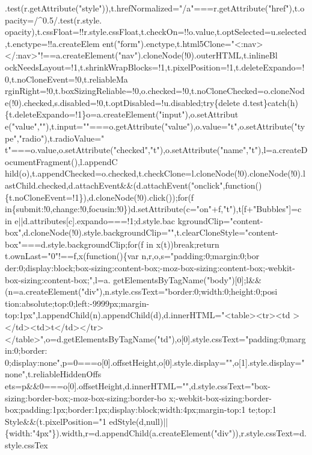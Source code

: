 \begin{DoxyCode}
{      .test(r.getAttribute("style")),t.hrefNormalized="/a"===r.getAttribute("href"),t.opacity=/^0.5/.test(r.style.
      opacity),t.cssFloat=!!r.style.cssFloat,t.checkOn=!!o.value,t.optSelected=u.selected,t.enctype=!!a.createElem
      ent("form").enctype,t.html5Clone="<:nav></:nav>"!==a.createElement("nav").cloneNode(!0).outerHTML,t.inlineBl
      ockNeedsLayout=!1,t.shrinkWrapBlocks=!1,t.pixelPosition=!1,t.deleteExpando=!0,t.noCloneEvent=!0,t.reliableMa
      rginRight=!0,t.boxSizingReliable=!0,o.checked=!0,t.noCloneChecked=o.cloneNode(!0).checked,s.disabled=!0,t.optDisabled=!u.disabled;try\{delete
       d.test\}catch(h)\{t.deleteExpando=!1\}o=a.createElement("input"),o.setAttribut
      e("value",""),t.input=""===o.getAttribute("value"),o.value="t",o.setAttribute("type","radio"),t.radioValue="
      t"===o.value,o.setAttribute("checked","t"),o.setAttribute("name","t"),l=a.createDocumentFragment(),l.appendC
      hild(o),t.appendChecked=o.checked,t.checkClone=l.cloneNode(!0).cloneNode(!0).lastChild.checked,d.attachEvent&&(d.attachEvent("onclick",function()\{t.noCloneEvent=!1\}),d.cloneNode(!0).click());for(f
       in\{submit:!0,change:!0,focusin:!0\})d.setAttribute(c="on"+f,"t"),t[f+"Bubbles"]=c in
       e||d.attributes[c].expando===!1;d.style.bac
      kgroundClip="content-box",d.cloneNode(!0).style.backgroundClip="",t.clearCloneStyle="content-box"===d.style.backgroundClip;for(f in x(t))break;return t.ownLast="0"!==f,x(function()\{var
       n,r,o,s="padding:0;margin:0;bor
      der:0;display:block;box-sizing:content-box;-moz-box-sizing:content-box;-webkit-box-sizing:content-box;",l=a.
      getElementsByTagName("body")[0];l&&(n=a.createElement("div"),n.style.cssText="border:0;width:0;height:0;posi
      tion:absolute;top:0;left:-9999px;margin-top:1px",l.appendChild(n).appendChild(d),d.innerHTML="<table><tr><td
      ></td><td>t</td></tr></table>",o=d.getElementsByTagName("td"),o[0].style.cssText="padding:0;margin:0;border:
      0;display:none",p=0===o[0].offsetHeight,o[0].style.display="",o[1].style.display="none",t.reliableHiddenOffs
      ets=p&&0===o[0].offsetHeight,d.innerHTML="",d.style.cssText="box-sizing:border-box;-moz-box-sizing:border-bo
      x;-webkit-box-sizing:border-box;padding:1px;border:1px;display:block;width:4px;margin-top:1%
      te;top:1%
      Style&&(t.pixelPosition="1%
      edStyle(d,null)||\{width:"4px"\}).width,r=d.appendChild(a.createElement("div")),r.style.cssText=d.style.cssTex
}
\end{DoxyCode}
